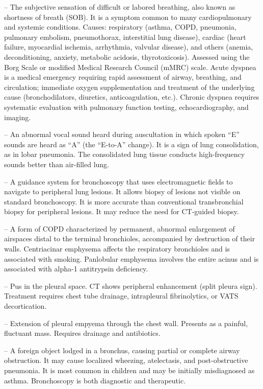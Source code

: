 -- The subjective sensation of difficult or labored breathing, also known as shortness of breath (SOB). It is a symptom common to many cardiopulmonary and systemic conditions. Causes: respiratory (asthma, COPD, pneumonia, pulmonary embolism, pneumothorax, interstitial lung disease), cardiac (heart failure, myocardial ischemia, arrhythmia, valvular disease), and others (anemia, deconditioning, anxiety, metabolic acidosis, thyrotoxicosis). Assessed using the Borg Scale or modified Medical Research Council (mMRC) scale. Acute dyspnea is a medical emergency requiring rapid assessment of airway, breathing, and circulation; immediate oxygen supplementation and treatment of the underlying cause (bronchodilators, diuretics, anticoagulation, etc.). Chronic dyspnea requires systematic evaluation with pulmonary function testing, echocardiography, and imaging.

-- An abnormal vocal sound heard during auscultation in which spoken ``E'' sounds are heard as ``A'' (the ``E-to-A'' change). It is a sign of lung consolidation, as in lobar pneumonia. The consolidated lung tissue conducts high-frequency sounds better than air-filled lung.

-- A guidance system for bronchoscopy that uses electromagnetic fields to navigate to peripheral lung lesions. It allows biopsy of lesions not visible on standard bronchoscopy. It is more accurate than conventional transbronchial biopsy for peripheral lesions. It may reduce the need for CT-guided biopsy.

-- A form of COPD characterized by permanent, abnormal enlargement of airspaces distal to the terminal bronchioles, accompanied by destruction of their walls. Centriacinar emphysema affects the respiratory bronchioles and is associated with smoking. Panlobular emphysema involves the entire acinus and is associated with alpha-1 antitrypsin deficiency.

-- Pus in the pleural space. CT shows peripheral enhancement (split pleura sign). Treatment requires chest tube drainage, intrapleural fibrinolytics, or VATS decortication.

-- Extension of pleural empyema through the chest wall. Presents as a painful, fluctuant mass. Requires drainage and antibiotics.

-- A foreign object lodged in a bronchus, causing partial or complete airway obstruction. It may cause localized wheezing, atelectasis, and post-obstructive pneumonia. It is most common in children and may be initially misdiagnosed as asthma. Bronchoscopy is both diagnostic and therapeutic.

